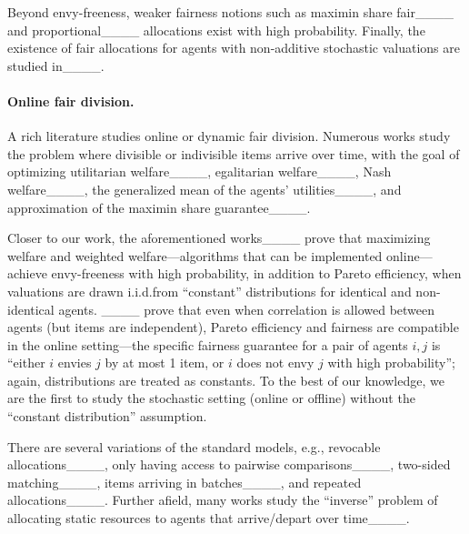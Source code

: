 Beyond envy-freeness, weaker fairness notions such as maximin share fair____ and proportional____ allocations exist with high probability. Finally, the existence of fair allocations for agents with non-additive stochastic valuations are studied in____.


\paragraph{Online fair division.}
A rich literature studies online or dynamic fair division. Numerous works study the problem where divisible or indivisible items arrive over time, with the goal of optimizing utilitarian welfare____, egalitarian welfare____, Nash welfare____, the generalized mean of the agents' utilities____, and approximation of the maximin share guarantee____.

Closer to our work, the aforementioned works____ prove that maximizing welfare and weighted welfare---algorithms that can be implemented online---achieve envy-freeness with high probability, in addition to Pareto efficiency, when valuations are drawn i.i.d.\@ from ``constant'' distributions for identical and non-identical agents. ____ prove that even when correlation is allowed between agents (but items are independent), Pareto efficiency and fairness are compatible in the online setting---the specific fairness guarantee for a pair of agents $i,j$ is ``either $i$ envies $j$ by at most 1 item, or $i$ does not envy $j$ with high probability''; again, distributions are treated as constants. To the best of our knowledge, we are the first to study the stochastic setting (online or offline) without the ``constant distribution'' assumption.



There are several variations of the standard models, e.g., revocable allocations____, only having access to pairwise comparisons____, two-sided matching____, items arriving in batches____, and repeated allocations____. Further afield, many works study the ``inverse'' problem of allocating static resources to agents that arrive/depart over time____.